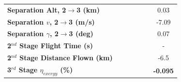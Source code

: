 \begin{table}[ht]
\begin{tabular}{l c c c c c c}
		\textbf{Separation Alt, 2$\rightarrow$3 (km)}
		& \secondthirdSeparationAltmThreeNinetyNoReturn
		& \secondthirdSeparationAltmThreeNinetyFiveNoReturn
		& \secondthirdSeparationAltmThreeStandardNoReturn
		& \secondthirdSeparationAltmThreeOneHundredFiveNoReturn
		& \secondthirdSeparationAltmThreeOneHundredTenNoReturn
		&0.03
		\\
		\textbf{Separation $v$, 2$\rightarrow$3 (m/s)}
		& \secondthirdSeparationvmThreeNinetyNoReturn
		& \secondthirdSeparationvmThreeNinetyFiveNoReturn
		& \secondthirdSeparationvmThreeStandardNoReturn
		& \secondthirdSeparationvmThreeOneHundredFiveNoReturn
		& \secondthirdSeparationvmThreeOneHundredTenNoReturn
		&-7.09
		\\
		\textbf{Separation $\gamma$, 2$\rightarrow$3 (deg)}
		& \secondthirdSeparationgammamThreeNinetyNoReturn
		& \secondthirdSeparationgammamThreeNinetyFiveNoReturn
		& \secondthirdSeparationgammamThreeStandardNoReturn
		& \secondthirdSeparationgammamThreeOneHundredFiveNoReturn
		& \secondthirdSeparationgammamThreeOneHundredTenNoReturn
		&0.07
		\\
		\textbf{2$^{nd}$ Stage Flight Time (s)}
		& \secondFlightTimemThreeNinetyNoReturn
		& \secondFlightTimemThreeNinetyFiveNoReturn
		& \secondFlightTimemThreeStandardNoReturn
		& \secondFlightTimemThreeOneHundredFiveNoReturn
		& \secondFlightTimemThreeOneHundredTenNoReturn
		& -
		\\
		\textbf{2$^{nd}$ Stage Distance Flown (km)}
		& \SecondDistmThreeNinetyNoReturn
		& \SecondDistmThreeNinetyFiveNoReturn
		& \SecondDistmThreeStandardNoReturn
		& \SecondDistmThreeOneHundredFiveNoReturn
		& \SecondDistmThreeOneHundredTenNoReturn
		&-6.5
		\\
		\hline 
		\textbf{3$^{rd}$ Stage $\eta_{exergy}$ (\%)}
		& \textbf{\thirddExergyEffmThreeNinetyNoReturn}
		& \textbf{\thirddExergyEffmThreeNinetyFiveNoReturn}
		& \textbf{\thirddExergyEffmThreeStandardNoReturn}
		& \textbf{\thirddExergyEffmThreeOneHundredFiveNoReturn}
		& \textbf{\thirddExergyEffmThreeOneHundredTenNoReturn}
		& \textbf{-0.095}
		\\
	

\end{tabular}
\end{table}

